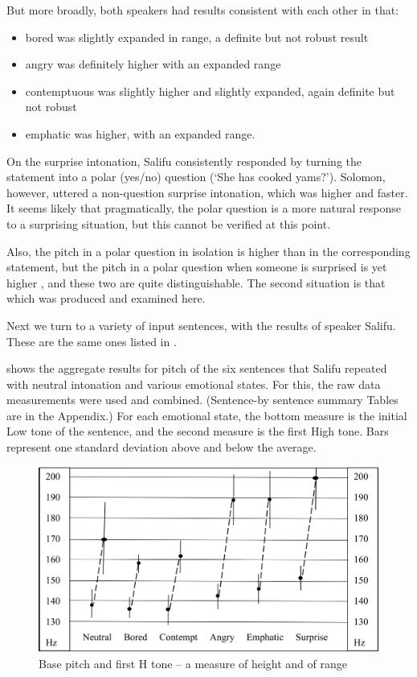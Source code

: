 \documentclass[output=paper]{langsci/langscibook}
\begin{document}
But more broadly, both speakers had results consistent with each other in that:

\begin{itemize}
\item bored was slightly expanded in range, a definite but not robust result
\item angry was definitely higher with an expanded range
\item contemptuous was slightly higher and slightly expanded, again definite but not robust
\item emphatic was higher, with an expanded range. 
\end{itemize}

On the surprise intonation, Salifu consistently responded by turning the statement into a polar (yes/no) question (`She has cooked yams?'). Solomon, however, uttered a non-question surprise intonation, which was higher and faster. It seems likely that pragmatically, the polar question is a more natural response to a surprising situation, but this cannot be verified at this point. 

Also, the pitch in a polar question in isolation is higher than in the corresponding statement, but the pitch in a polar question when someone is surprised is yet higher \citep{cahill2012}, and these two are quite distinguishable. The second situation is that which was produced and examined here.


Next we turn to a variety of input sentences, with the results of speaker Salifu. These are the same ones listed in .


 shows the aggregate results for pitch of the six sentences that Salifu repeated with neutral intonation and various emotional states. For this, the raw data measurements were used and combined. (Sentence-by sentence summary Tables are in the Appendix.) For each emotional state, the bottom measure is the initial Low tone of the sentence, and the second measure is the first High tone. Bars represent one standard deviation above and below the average.


\begin{figure}[h]
\includegraphics[width=\textwidth]{figures/cahillfig2}
\caption{Base pitch and first H tone -- a measure of height and of range}
\label{fig:2.cahill}
\end{figure}
\end{document}
